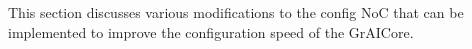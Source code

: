 This section discusses various modifications to the config NoC that can be implemented to improve the configuration speed of the GrAICore.

\lipsum[1]